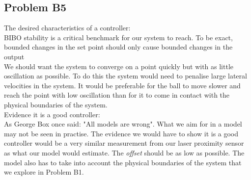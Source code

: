 \subsection*{Problem B5}
\hfill \break 
The desired characteristics of a controller: \\
BIBO stability is a critical benchmark for our system to reach. To be exact, bounded changes in the set point should only cause bounded changes in the output \\
We should want the system to converge on a point quickly but with as little oscillation as possible. To do this the system would need to penalise large lateral velocities in the system. It would be preferable for the ball to move slower and reach the point with low oscillation than for it to come in contact with the physical boundaries of the system.\\
Evidence it is a good controller:\\
As George Box once said: "All models are wrong". What we aim for in a model may not be seen in practise. The evidence we would have to show it is a good controller would be a very similar measurement from our laser proximity sensor as what our model would estimate. The \emph{offset} should be as low as possible. The model also has to take into account the physical boundaries of the system that we explore in Problem B1. 
